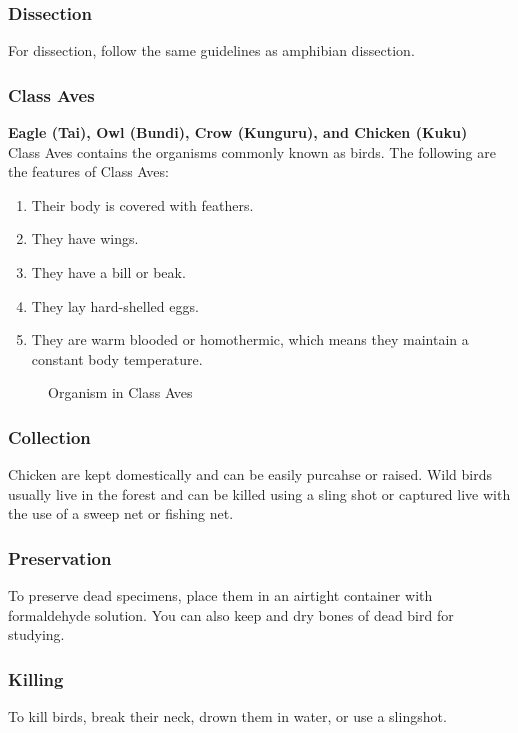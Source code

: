 \subsubsection{Dissection}
For dissection, follow the same guidelines as amphibian dissection.

\subsubsection{Class Aves}

\textbf{Eagle (Tai), Owl (Bundi), Crow (Kunguru), and Chicken (Kuku)}\\ Class Aves contains the organisms commonly known as birds. The following are the features of Class Aves:\\
\begin{enumerate}
\item{Their body is covered with feathers.}
\item{They have wings.}
\item{They have a bill or beak.}
\item{They lay hard-shelled eggs.}
\item{They are warm blooded or homothermic, which means they maintain a constant body temperature.}
\end{enumerate}

\begin{figure}
\begin{center}
\def\svgwidth{6cm}

\caption{Organism in Class Aves}
\label{fig:bird}
\end{center}
\end{figure}

\subsubsection{Collection}
Chicken are kept domestically and can be easily purcahse or raised. Wild birds usually live in the forest and can be killed using a sling shot or captured live with the use of a sweep net or fishing net.

\subsubsection{Preservation} 
To preserve dead specimens, place them in an airtight container with formaldehyde solution. You can also keep and dry bones of dead bird for studying.

\subsubsection{Killing}
 To kill birds, break their neck, drown them in water, or use a slingshot.

